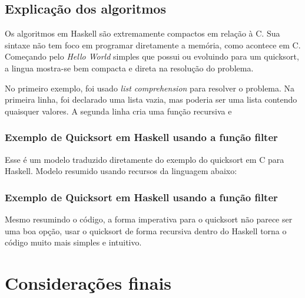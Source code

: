 \documentclass[
  12pt,				         %
  oneside,			       %
  a4paper,			       %
  english,		       	 %
  brazil,			      	 %
]{abntex2}
\begin{document}
      

      \section{Explicação dos algoritmos}
      Os algoritmos em Haskell são extremamente compactos em relação à C. Sua sintaxe não tem foco
      em programar diretamente a memória, como acontece em C. Começando pelo \emph{Hello World} simples que possui ou evoluindo
      para um quicksort, a lingua mostra-se bem compacta e direta na resolução do problema.

      No primeiro exemplo, foi usado \emph{list comprehension} para resolver o problema. Na primeira linha,
      foi declarado uma lista vazia, mas poderia ser uma lista contendo quaisquer valores. A segunda linha
      cria uma função recursiva e 

      \subsection{Exemplo de Quicksort em Haskell usando a função filter}

      

      Esse é um modelo traduzido diretamente do exemplo do quicksort em C para Haskell. Modelo resumido usando recursos da linguagem
      abaixo:

      \subsection{Exemplo de Quicksort em Haskell usando a função filter} 

      

      Mesmo resumindo o código, a forma imperativa para o quicksort não parece ser uma boa opção, usar o quicksort de forma recursiva
      dentro do Haskell torna o código muito mais simples e intuitivo.

      \nocite{beginnersbook}
      \nocite{qastack}
      \nocite{haskellreport98}
      \nocite{progfuncional}

    \newpage


    \chapter*[Considerações finais]{Considerações finais}
\end{document}
